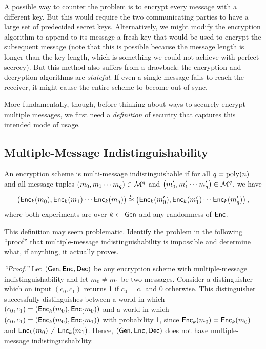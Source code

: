 \documentclass[11pt]{article}
\begin{document}
A possible way to counter the problem is to encrypt every message with
a different key.  But this would require the two communicating parties
to have a large set of predecided secret keys.  Alternatively, we
might modify the encryption algorithm to append to its message a fresh
key that would be used to encrypt the subsequent message (note that
this is possible because the message length is longer than the key
length, which is something we could not achieve with perfect secrecy).
But this method also suffers from a drawback: the encryption and
decryption algorithms are \emph{stateful}.  If even a single message
fails to reach the receiver, it might cause the entire scheme to
become out of sync.

More fundamentally, though, before thinking about ways to securely
encrypt multiple messages, we first need a \emph{definition} of
security that captures this intended mode of usage.

\subsection{Multiple-Message Indistinguishability}
\label{sec:mult-mess-indist}

\begin{definition}
  \label{def:multi-msg-indist}
  An encryption scheme is multi-message indistinguishable if for all
  $q=\operatorname{poly}(n)$ and all message tuples $\left( m_0, m_1 \cdots m_q
  \right) \in \mathcal{M}^q$ and $\left( m'_0, m'_1 \cdots m'_q \right)
  \in \mathcal{M}^q$, we have
  \[ \left( \mathsf{Enc}_k(m_0), \mathsf{Enc}_k(m_1) \cdots \mathsf{Enc}_k(m_q)
  \right) \stackrel{c}{\approx} \left( \mathsf{Enc}_k(m'_0), \mathsf{Enc}_k(m'_1) \cdots
    \mathsf{Enc}_k(m'_q) \right), \] where both experiments are over $k
  \gets \mathsf{Gen}$ and any randomness of $\mathsf{Enc}$.
\end{definition}

\begin{question}
  This definition may seem problematic. Identify the problem in the
  following ``proof'' that multiple-message indistinguishability is
  impossible and determine what, if
  anything, it actually proves.

  \medskip\noindent \emph{``Proof.''} Let
  \((\mathsf{Gen}, \mathsf{Enc}, \mathsf{Dec})\) be any encryption scheme with
  multiple-message indistinguishability and let \(m_0 \neq m_1\) be
  two messages. Consider a distinguisher which on input \((c_0, c_1)\)
  returns 1 if \(c_0 = c_1\) and 0 otherwise. This distinguisher
  successfully distinguishes between a world in which
  \((c_0, c_1) = (\mathsf{Enc}_k(m_0), \mathsf{Enc}_(m_0))\) and a world in
  which \((c_0, c_1) = (\mathsf{Enc}_k(m_0), \mathsf{Enc}_(m_1))\) with
  probability 1, since \(\mathsf{Enc}_k(m_0) = \mathsf{Enc}_k(m_0)\) and
  \(\mathsf{Enc}_k(m_0) \neq \mathsf{Enc}_k(m_1)\).  Hence,
  \((\mathsf{Gen}, \mathsf{Enc}, \mathsf{Dec})\) does not have multiple-message
  indistinguishability.
\end{question}
\end{document}
